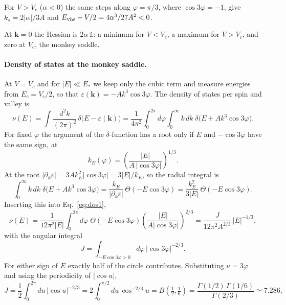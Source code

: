 \documentclass[11pt,a4paper]{article}
\numberwithin{equation}{section}
\newcommand{\bk}{\mathbf{k}}
\newcommand{\Evhs}{E_{\rm vhs}}
\begin{document}
For $V>V_c$ ($\alpha<0$) the same steps along $\varphi=\pi/3$, where $\cos3\varphi=-1$, give $k_s=2|\alpha|/3A$ and $\Evhs-V/2=4\alpha^3/27A^2<0$.

At $\bk=0$ the Hessian is $2\alpha\,\mathbb 1$: a minimum for $V<V_c$, a maximum for $V>V_c$, and zero at $V_c$, the monkey saddle.

\paragraph{Density of states at the monkey saddle.}
At $V=V_c$ and for $|E|\ll E_*$ we keep only the cubic term and measure energies from $E_c=V_c/2$, so that $\varepsilon(\bk)=-Ak^3\cos3\varphi$. The density of states per spin and valley is
\begin{equation}
\nu(E)=\int\!\frac{d^2k}{(2\pi)^2}\,\delta\big(E-\varepsilon(\bk)\big)
=\frac{1}{4\pi^2}\int_0^{2\pi}\!d\varphi\int_0^\infty\!k\,dk\;\delta\big(E+Ak^3\cos3\varphi\big).
\label{eq:dos1}
\end{equation}
For fixed $\varphi$ the argument of the $\delta$-function has a root only if $E$ and $-\cos3\varphi$ have the same sign, at
\begin{equation}
k_E(\varphi)=\left(\frac{|E|}{A\,|\cos3\varphi|}\right)^{1/3}.
\end{equation}
At the root $|\partial_k\varepsilon|=3Ak_E^2|\cos3\varphi|=3|E|/k_E$, so the radial integral is
\begin{equation}
\int_0^\infty\!k\,dk\;\delta\big(E+Ak^3\cos3\varphi\big)=\frac{k_E}{|\partial_k\varepsilon|}\,\Theta(-E\cos3\varphi)=\frac{k_E^2}{3|E|}\,\Theta(-E\cos3\varphi).
\end{equation}
Inserting this into Eq.~\eqref{eq:dos1},
\begin{equation}
\nu(E)=\frac{1}{12\pi^2|E|}\int_0^{2\pi}\!d\varphi\;\Theta(-E\cos3\varphi)\left(\frac{|E|}{A|\cos3\varphi|}\right)^{2/3}
=\frac{J}{12\pi^2A^{2/3}}\,|E|^{-1/3},
\end{equation}
with the angular integral
\begin{equation}
J=\int_{-E\cos3\varphi>0}\!d\varphi\,|\cos3\varphi|^{-2/3}.
\end{equation}
For either sign of $E$ exactly half of the circle contributes. Substituting $u=3\varphi$ and using the periodicity of $|\cos u|$,
\begin{equation}
J=\frac12\int_0^{2\pi}\!du\,|\cos u|^{-2/3}=2\int_0^{\pi/2}\!du\,\cos^{-2/3}u
=B\!\left(\tfrac12,\tfrac16\right)=\frac{\Gamma(1/2)\,\Gamma(1/6)}{\Gamma(2/3)}\simeq7.286 ,
\end{equation}
\end{document}
